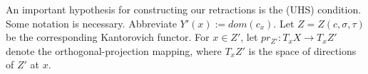 \documentclass[12pt]{amsart}
\theoremstyle{definition}
\theoremstyle{remark}
\begin{document}









An important hypothesis for constructing our retractions is the (UHS) condition. Some notation is necessary. Abbreviate $Y'(x):=dom(c_x)$. Let $Z=Z(c, \sigma, \tau)$ be the corresponding Kantorovich functor. For $x\in Z'$, let $pr_{Z'}: T_{x} X \to T_{x} Z'$ denote the orthogonal-projection mapping, where $T_{x} Z'$ is the space of directions of $Z'$ at $x$. 


\end{document}
